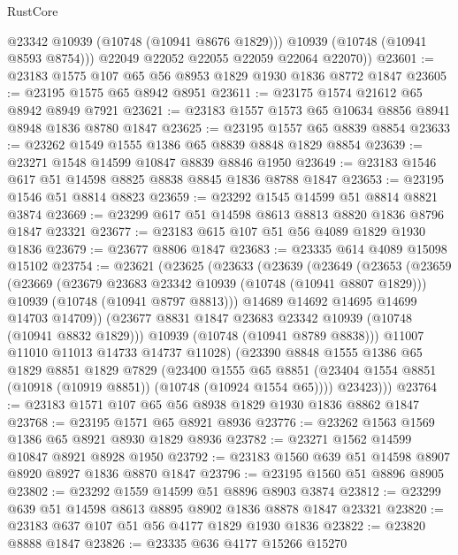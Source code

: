 \begin{lexlean}{RustCore}
\begin{coremodule}
            @23342
            @10939
            (@10748 (@10941 @8676 @1829)))
          @10939
          (@10748 (@10941 @8593 @8754)))
        @22049
        @22052
        @22055
        @22059
        @22064
        @22070))
@23601 := @23183 @1575 @107 @65 @56 @8953 @1829 @1930 @1836 @8772 @1847
@23605 := @23195 @1575 @65 @8942 @8951
@23611 := @23175 @1574 @21612 @65 @8942 @8949 @7921
@23621 := @23183 @1557 @1573 @65 @10634 @8856 @8941 @8948 @1836 @8780 @1847
@23625 := @23195 @1557 @65 @8839 @8854
@23633 := @23262 @1549 @1555 @1386 @65 @8839 @8848 @1829 @8854
@23639 := @23271 @1548 @14599 @10847 @8839 @8846 @1950
@23649 := @23183 @1546 @617 @51 @14598 @8825 @8838 @8845 @1836 @8788 @1847
@23653 := @23195 @1546 @51 @8814 @8823
@23659 := @23292 @1545 @14599 @51 @8814 @8821 @3874
@23669 := @23299 @617 @51 @14598 @8613 @8813 @8820 @1836 @8796 @1847 @23321
@23677 := @23183 @615 @107 @51 @56 @4089 @1829 @1930 @1836
@23679 := @23677 @8806 @1847
@23683 := @23335 @614 @4089 @15098 @15102
@23754 := @23621
    (@23625
      (@23633
        (@23639
          (@23649
            (@23653
              (@23659
                (@23669
                  (@23679 @23683 @23342 @10939 (@10748 (@10941 @8807 @1829)))
                  @10939
                  (@10748 (@10941 @8797 @8813)))
                @14689
                @14692
                @14695
                @14699
                @14703
                @14709))
            (@23677 @8831 @1847 @23683 @23342 @10939 (@10748 (@10941 @8832 @1829)))
            @10939
            (@10748 (@10941 @8789 @8838)))
          @11007
          @11010
          @11013
          @14733
          @14737
          @11028)
        (@23390
          @8848
          @1555
          @1386
          @65
          @1829
          @8851
          @1829
          @7829
          (@23400
            @1555
            @65
            @8851
            (@23404 @1554 @8851 (@10918 (@10919 @8851)) (@10748 (@10924 @1554 @65))))
          @23423)))
@23764 := @23183 @1571 @107 @65 @56 @8938 @1829 @1930 @1836 @8862 @1847
@23768 := @23195 @1571 @65 @8921 @8936
@23776 := @23262 @1563 @1569 @1386 @65 @8921 @8930 @1829 @8936
@23782 := @23271 @1562 @14599 @10847 @8921 @8928 @1950
@23792 := @23183 @1560 @639 @51 @14598 @8907 @8920 @8927 @1836 @8870 @1847
@23796 := @23195 @1560 @51 @8896 @8905
@23802 := @23292 @1559 @14599 @51 @8896 @8903 @3874
@23812 := @23299 @639 @51 @14598 @8613 @8895 @8902 @1836 @8878 @1847 @23321
@23820 := @23183 @637 @107 @51 @56 @4177 @1829 @1930 @1836
@23822 := @23820 @8888 @1847
@23826 := @23335 @636 @4177 @15266 @15270

\end{coremodule}
\end{lexlean}
